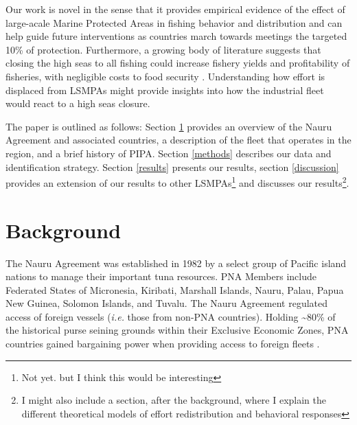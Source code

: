 \documentclass[11pt,]{article}
\let\rmarkdownfootnote\footnote%
\def\footnote{\protect\rmarkdownfootnote}
\begin{document}
Our work is novel in the sense that it provides empirical evidence of
the effect of large-acale Marine Protected Areas in fishing behavior and
distribution and can help guide future interventions as countries march
towards meetings the targeted 10\% of protection. Furthermore, a growing
body of literature suggests that closing the high seas to all fishing
could increase fishery yields and profitability of fisheries, with
negligible costs to food security
\citep{white_2014,sumaila_2015,sala_2018a,schiller_2018}. Understanding
how effort is displaced from LSMPAs might provide insights into how the
industrial fleet would react to a high seas closure.

The paper is outlined as follows: Section \ref{background} provides an
overview of the Nauru Agreement and associated countries, a description
of the fleet that operates in the region, and a brief history of PIPA.
Section \ref{methods} describes our data and identification strategy.
Section \ref{results} presents our results, section \ref{discussion}
provides an extension of our results to other
LSMPAs\footnote{Not yet. but I think this would be interesting} and
discusses our
results\footnote{I might also include a section, after the background, where I explain the different theoretical models of effort redistribution and behavioral responses}.

\hypertarget{background}{%
\section{Background}\label{background}}

The Nauru Agreement was established in 1982 by a select group of Pacific
island nations to manage their important tuna resources. PNA Members
include Federated States of Micronesia, Kiribati, Marshall Islands,
Nauru, Palau, Papua New Guinea, Solomon Islands, and Tuvalu. The Nauru
Agreement regulated access of foreign vessels (\emph{i.e.} those from
non-PNA countries). Holding \textasciitilde{}80\% of the historical
purse seining grounds within their Exclusive Economic Zones, PNA
countries gained bargaining power when providing access to foreign
fleets \citep{havice_2010}.
\end{document}
